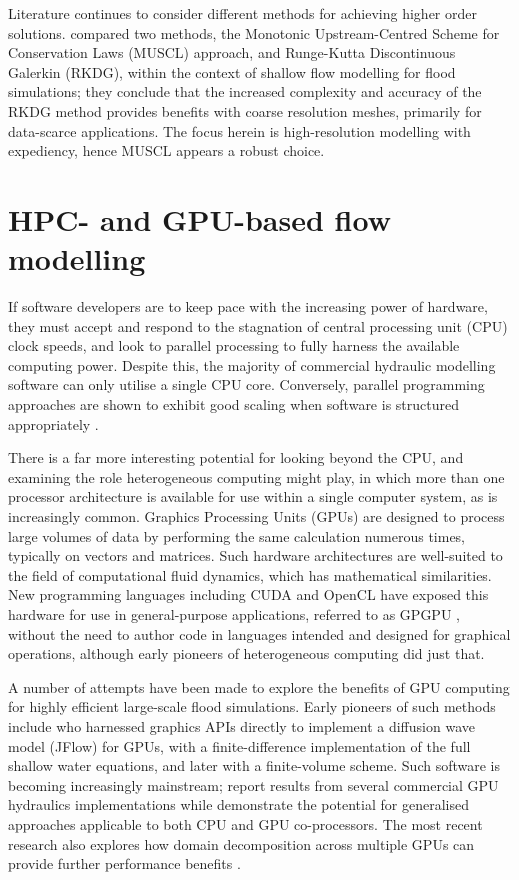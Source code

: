Literature continues to consider different methods for achieving higher order solutions. \citet{Kesserwani2014} compared two methods, the Monotonic Upstream-Centred Scheme for Conservation Laws (MUSCL) approach, and Runge-Kutta Discontinuous Galerkin (RKDG), within the context of shallow flow modelling for flood simulations; they conclude that the increased complexity and accuracy of the RKDG method provides benefits with coarse resolution meshes, primarily for data-scarce applications. The focus herein is high-resolution modelling with expediency, hence MUSCL appears a robust choice.

\section{HPC- and GPU-based flow modelling}

If software developers are to keep pace with the increasing power of hardware, they must accept and respond to the stagnation of central processing unit (CPU) clock speeds, and look to parallel processing to fully harness the available computing power. Despite this, the majority of commercial hydraulic modelling software can only utilise a single CPU core. Conversely, parallel programming approaches are shown to exhibit good scaling when software is structured appropriately \citep[e.g.][]{Neal2010,Saetra2012}.

There is a far more interesting potential for looking beyond the CPU, and examining the role heterogeneous computing might play, in which more than one processor architecture is available for use within a single computer system, as is increasingly common. Graphics Processing Units (GPUs) are designed to process large volumes of data by performing the same calculation numerous times, typically on vectors and matrices. Such hardware architectures are well-suited to the field of computational fluid dynamics, which has mathematical similarities. New programming languages including CUDA and OpenCL have exposed this hardware for use in general-purpose applications, referred to as GPGPU \citep{Owens2007,Nickolls2010}, without the need to author code in languages intended and designed for graphical operations, although early pioneers of heterogeneous computing did just that.

A number of attempts have been made to explore the benefits of GPU computing for highly efficient large-scale flood simulations. Early pioneers of such methods include \citet{Crossley2009} who harnessed graphics APIs directly to implement a diffusion wave model (JFlow) for GPUs, \citet{Kalyanapu2011} with a finite-difference implementation of the full shallow water equations, and later \citet{Brodtkorb2012} with a finite-volume scheme. Such software is becoming increasingly mainstream; \citet{Pender2013} report results from several commercial GPU hydraulics implementations while \citet{Smith2013} demonstrate the potential for generalised approaches applicable to both CPU and GPU co-processors. The most recent research also explores how domain decomposition across multiple GPUs can provide further performance benefits \citep{Saetra2012}.

